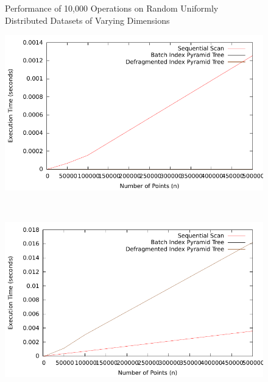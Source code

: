 \begin{figure}
		\caption{Performance of 10,000 Operations on Random Uniformly Distributed Datasets of Varying Dimensions}

		\label{fig:perf1-dimensionality}
\end{figure}

\begin{figure}
		\begin{center}
			\begin{subfloat}{%
				\includegraphics[scale=0.5]{figures/performance_analysis/iteration_1/all_insert_sizevary_average.pdf}
			}
			\end{subfloat}~
			\begin{subfloat} {%
				\includegraphics[scale=0.5]{figures/performance_analysis/iteration_1/all_delete_sizevary_average.pdf}
			}
			\end{subfloat}

\end{center}
\end{figure}
